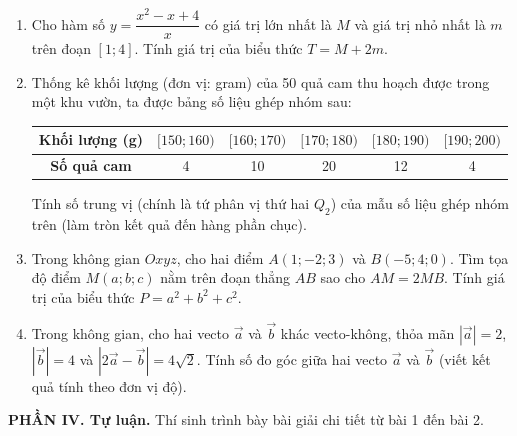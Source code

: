 \documentclass[12pt]{article}
\begin{document}
	\begin{enumerate}[label=\textbf{Câu \arabic*.}, leftmargin=*]
		
		\item Cho hàm số $y = \dfrac{x^2 - x + 4}{x}$ có giá trị lớn nhất là $M$ và giá trị nhỏ nhất là $m$ trên đoạn $[1; 4]$. Tính giá trị của biểu thức $T = M + 2m$.
		
		\vspace{2mm}
		\item Thống kê khối lượng (đơn vị: gram) của 50 quả cam thu hoạch được trong một khu vườn, ta được bảng số liệu ghép nhóm sau:
		\begin{center}
			\renewcommand{\arraystretch}{1.2}
			\begin{tabular}{|c|c|c|c|c|c|}
				\hline
				\textbf{Khối lượng (g)} & $[150; 160)$ & $[160; 170)$ & $[170; 180)$ & $[180; 190)$ & $[190; 200)$ \\
				\hline
				\textbf{Số quả cam} & 4 & 10 & 20 & 12 & 4 \\
				\hline
			\end{tabular}
		\end{center}
		Tính số trung vị (chính là tứ phân vị thứ hai $Q_2$) của mẫu số liệu ghép nhóm trên (làm tròn kết quả đến hàng phần chục).
		
		\vspace{2mm}
		\item Trong không gian $Oxyz$, cho hai điểm $A(1; -2; 3)$ và $B(-5; 4; 0)$. Tìm tọa độ điểm $M(a; b; c)$ nằm trên đoạn thẳng $AB$ sao cho $AM = 2MB$. Tính giá trị của biểu thức $P = a^2 + b^2 + c^2$.
		
		\vspace{2mm}
		\item Trong không gian, cho hai vecto $\vec{a}$ và $\vec{b}$ khác vecto-không, thỏa mãn $|\vec{a}| = 2$, $|\vec{b}| = 4$ và $|2\vec{a} - \vec{b}| = 4\sqrt{2}$. Tính số đo góc giữa hai vecto $\vec{a}$ và $\vec{b}$ (viết kết quả tính theo đơn vị độ).
		
	\end{enumerate}
	
	\vspace{4mm}
	\noindent\textbf{PHẦN IV. Tự luận.} Thí sinh trình bày bài giải chi tiết từ bài 1 đến bài 2.
	\vspace{2mm}
	
\end{document}
